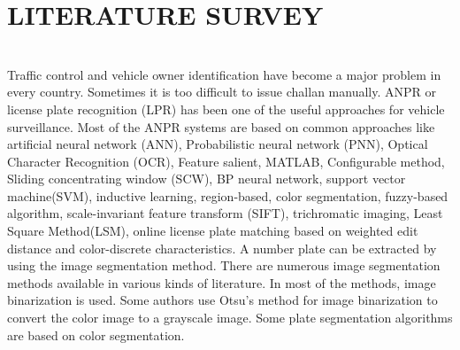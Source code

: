 \documentclass[12pt,a4paper]{report}
\begin{document}
\chapter{LITERATURE SURVEY}\\
Traffic control and vehicle owner identification have become a major problem in every country. Sometimes it is too difficult to issue challan manually. ANPR or license plate recognition (LPR) has been one of the useful approaches for vehicle surveillance. Most of the ANPR systems are based on common approaches like artificial neural network (ANN), Probabilistic neural network (PNN), Optical Character Recognition (OCR), Feature salient, MATLAB, Configurable method, Sliding concentrating window (SCW), BP neural network, support vector machine(SVM), inductive learning, region-based, color segmentation, fuzzy-based algorithm, scale-invariant feature transform (SIFT), trichromatic imaging, Least Square Method(LSM), online license plate matching based on weighted edit distance and color-discrete characteristics. A number plate can be extracted by using the image segmentation method. There are numerous image segmentation methods available in various kinds of literature. In most of the methods, image binarization is used. Some authors use Otsu’s method for image binarization to convert the color image to a grayscale image. Some plate segmentation algorithms are based on color segmentation.
\newpage
\end{document}
